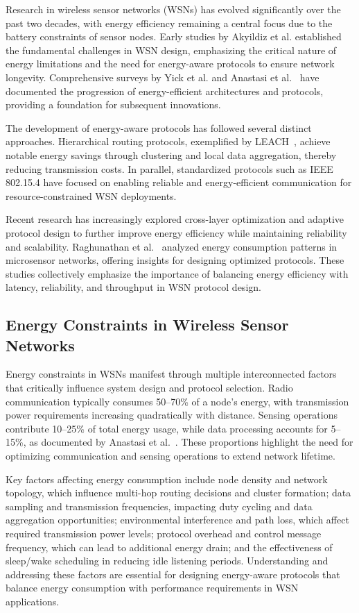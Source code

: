 \documentclass[conference]{IEEEtran}
\begin{document}
Research in wireless sensor networks (WSNs) has evolved significantly over the past two decades, with energy efficiency remaining a central focus due to the battery constraints of sensor nodes. Early studies by Akyildiz et al.\cite{sensor_ref} established the fundamental challenges in WSN design, emphasizing the critical nature of energy limitations and the need for energy-aware protocols to ensure network longevity. Comprehensive surveys by Yick et al.\cite{wsn_survey} and Anastasi et al.~\cite{energy_survey} have documented the progression of energy-efficient architectures and protocols, providing a foundation for subsequent innovations.

The development of energy-aware protocols has followed several distinct approaches. Hierarchical routing protocols, exemplified by LEACH~\cite{leach_journal}, achieve notable energy savings through clustering and local data aggregation, thereby reducing transmission costs.  In parallel, standardized protocols such as IEEE 802.15.4\cite{ieee802154_spec} have focused on enabling reliable and energy-efficient communication for resource-constrained WSN deployments.

Recent research has increasingly explored cross-layer optimization and adaptive protocol design to further improve energy efficiency while maintaining reliability and scalability. Raghunathan et al.~\cite{wsn_energy} analyzed energy consumption patterns in microsensor networks, offering insights for designing optimized protocols. These studies collectively emphasize the importance of balancing energy efficiency with latency, reliability, and throughput in WSN protocol design.

\subsection{Energy Constraints in Wireless Sensor Networks}

Energy constraints in WSNs manifest through multiple interconnected factors that critically influence system design and protocol selection. Radio communication typically consumes 50--70\% of a node’s energy, with transmission power requirements increasing quadratically with distance. Sensing operations contribute 10--25\% of total energy usage, while data processing accounts for 5--15\%, as documented by Anastasi et al.~\cite{energy_survey}. These proportions highlight the need for optimizing communication and sensing operations to extend network lifetime.

Key factors affecting energy consumption include node density and network topology, which influence multi-hop routing decisions and cluster formation; data sampling and transmission frequencies, impacting duty cycling and data aggregation opportunities; environmental interference and path loss, which affect required transmission power levels; protocol overhead and control message frequency, which can lead to additional energy drain; and the effectiveness of sleep/wake scheduling in reducing idle listening periods. Understanding and addressing these factors are essential for designing energy-aware protocols that balance energy consumption with performance requirements in WSN applications.
\end{document}
